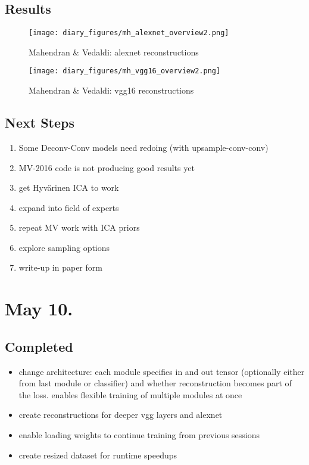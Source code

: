 \documentclass{article}
\begin{document}
\subsection*{Results}
\FloatBarrier
\begin{figure}
    \centering
    \texttt{[image: diary\_figures/mh\_alexnet\_overview2.png]}
    \caption{Mahendran \& Vedaldi: alexnet reconstructions}
    \label{fig:mh_alex}
\end{figure}

\begin{figure}
    \centering
    \texttt{[image: diary\_figures/mh\_vgg16\_overview2.png]}
    \caption{Mahendran \& Vedaldi: vgg16 reconstructions}
    \label{fig:mh_vgg}
\end{figure}
\FloatBarrier
\subsection*{Next Steps}
\begin{enumerate}
    \item Some Deconv-Conv models need redoing (with upsample-conv-conv)
    \item MV-2016 code is not producing good results yet
    \item get Hyvärinen ICA to work
    \item expand into field of experts
    \item repeat MV work with ICA priors
    \item explore sampling options
    \item write-up in paper form
\end{enumerate}


\section*{May 10.}

\subsection*{Completed}
\begin{itemize}
    \item change architecture: each module specifies in and out tensor (optionally either from last module or classifier) and whether reconstruction becomes part of the loss. enables flexible training of multiple modules at once
    \item  create reconstructions for deeper vgg layers and alexnet
    \item enable loading weights to continue training from previous sessions
    \item create resized dataset for runtime speedups
\end{itemize}
\end{document}
